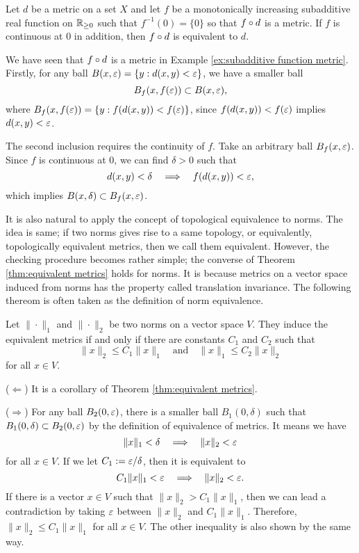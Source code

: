 \documentclass{../crs}
\begin{document}
\begin{thm}\label{thm:subadditive equivalent metrics}
Let $d$ be a metric on a set $X$ and let $f$ be a monotonically increasing subadditive real function on $\mathbb{R}_{\ge0}$ such that $f^{-1}(0)=\{0\}$ so that $f\circ d$ is a metric.
If $f$ is continuous at 0 in addition, then $f\circ d$ is equivalent to $d$.
\end{thm}
\begin{pf}
We have seen that $f\circ d$ is a metric in Example \ref{ex:subadditive function metric}.
Firstly, for any ball $B(x,\varepsilon)=\{y:d(x,y)<\varepsilon\}$, we have a smaller ball
\[B_f(x,f(\varepsilon))\subset B(x,\varepsilon),\]
where $B_f(x,f(\varepsilon))=\{y:f(d(x,y))<f(\varepsilon)\}$, since $f(d(x,y))<f(\varepsilon)$ implies $d(x,y)<\varepsilon$.

The second inclusion requires the continuity of $f$.
Take an arbitrary ball $B_f(x,\varepsilon)$.
Since $f$ is continuous at 0, we can find $\delta>0$ such that
\[d(x,y)<\delta\impl f(d(x,y))<\e,\]
which implies $B(x,\delta)\subset B_f(x,\varepsilon)$.
\end{pf}


It is also natural to apply the concept of topological equivalence to norms.
The idea is same; if two norms gives rise to a same topology, or equivalently, topologically equivalent metrics, then we call them equivalent.
However, the checking procedure becomes rather simple; the converse of Theorem \ref{thm:equivalent metrics} holds for norms.
It is because metrics on a vector space induced from norms has the property called translation invariance.
The following thereom is often taken as the definition of norm equivalence.

\begin{thm}
Let $\|\cdot\|_1$ and $\|\cdot\|_2$ be two norms on a vector space $V$.
They induce the equivalent metrics if and only if there are constants $C_1$ and $C_2$ such that
\[\|x\|_2\le C_1\|x\|_1\quad\text{and}\quad\|x\|_1\le C_2\|x\|_2\]
for all $x\in V$.
\end{thm}
\begin{pf}
($\Leftarrow$) It is a corollary of Theorem \ref{thm:equivalent metrics}.

($\Rightarrow$)
For any ball $B_2(0,\varepsilon)$, there is a smaller ball $B_1(0,\delta)$ such that $B_1(0,\delta)\subset B_2(0,\varepsilon)$ by the definition of equivalence of metrics.
It means we have
\[\|x\|_1<\delta\impl\|x\|_2<\e\]
for all $x\in V$.
If we let $C_1:=\varepsilon/\delta$, then it is equivalent to
\[C_1\|x\|_1<\e\impl\|x\|_2<\e.\]
If there is a vector $x\in V$ such that $\|x\|_2>C_1\|x\|_1$, then we can lead a contradiction by taking $\varepsilon$ between $\|x\|_2$ and $C_1\|x\|_1$.
Therefore, $\|x\|_2\le C_1\|x\|_1$ for all $x\in V$.
The other inequality is also shown by the same way.
\end{pf}
\end{document}
